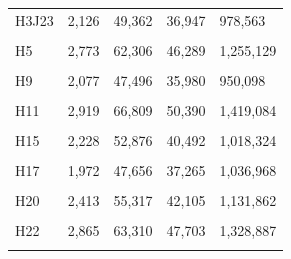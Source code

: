 \documentclass[
  a4paper,
  titlepage]{article}
\begin{document}
\begin{longtable}[t]{lllll}
H3J23 & 2,126 & 49,362 & 36,947 & 978,563\\
 
\cellcolor{gray!6}{H4} & \cellcolor{gray!6}{2,058} & \cellcolor{gray!6}{47,533} & \cellcolor{gray!6}{37,113} & \cellcolor{gray!6}{1,058,643}\\
 
H5 & 2,773 & 62,306 & 46,289 & 1,255,129\\
 
\cellcolor{gray!6}{H8} & \cellcolor{gray!6}{1,930} & \cellcolor{gray!6}{45,123} & \cellcolor{gray!6}{34,499} & \cellcolor{gray!6}{1,010,558}\\
 
H9 & 2,077 & 47,496 & 35,980 & 950,098\\
 
\cellcolor{gray!6}{H10} & \cellcolor{gray!6}{3,068} & \cellcolor{gray!6}{70,389} & \cellcolor{gray!6}{53,071} & \cellcolor{gray!6}{1,482,942}\\
 
H11 & 2,919 & 66,809 & 50,390 & 1,419,084\\
 
\cellcolor{gray!6}{H13} & \cellcolor{gray!6}{2,345} & \cellcolor{gray!6}{53,207} & \cellcolor{gray!6}{40,341} & \cellcolor{gray!6}{1,256,450}\\
 
H15 & 2,228 & 52,876 & 40,492 & 1,018,324\\
 
\cellcolor{gray!6}{H16} & \cellcolor{gray!6}{2,336} & \cellcolor{gray!6}{55,508} & \cellcolor{gray!6}{42,457} & \cellcolor{gray!6}{1,213,288}\\
 
H17 & 1,972 & 47,656 & 37,265 & 1,036,968\\
 
\cellcolor{gray!6}{H18} & \cellcolor{gray!6}{2,486} & \cellcolor{gray!6}{56,326} & \cellcolor{gray!6}{42,602} & \cellcolor{gray!6}{1,261,383}\\
 
H20 & 2,413 & 55,317 & 42,105 & 1,131,862\\
 
\cellcolor{gray!6}{H21} & \cellcolor{gray!6}{2,582} & \cellcolor{gray!6}{58,614} & \cellcolor{gray!6}{43,876} & \cellcolor{gray!6}{1,212,232}\\
 
H22 & 2,865 & 63,310 & 47,703 & 1,328,887\\
 
\cellcolor{gray!6}{H23} & \cellcolor{gray!6}{2,381} & \cellcolor{gray!6}{52,129} & \cellcolor{gray!6}{38,935} & \cellcolor{gray!6}{1,063,407}\\
 

\end{longtable}
\end{document}
